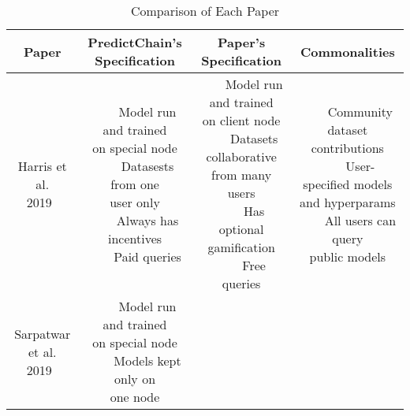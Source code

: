 \documentclass{article}
\newcommand{\tabitem}{~~\llap{\textbullet}~~}
\begin{document}
    \begin{table}[H]
        \begin{center}
            \caption{Comparison of Each Paper}
            \label{tab:relatedSummary}
            \bgroup
            \def\arraystretch{3}
            \begin{tabular}{c|c|c|c}
                \textbf{Paper} & \makecell{\textbf{PredictChain's}\\\textbf{Specification}} & \textbf{Paper's Specification} & \textbf{Commonalities}\\
                \hline
                \makecell{Harris et al.\\2019~\cite{sharingModels}} &
                \makecell[l]{
                    \tabitem Model run and trained\\on special node\\
                    \tabitem Datasests from one\\user only\\
                    \tabitem Always has incentives\\
                    \tabitem Paid queries\\
                } & \makecell[l]{
                    \tabitem Model run and trained\\on client node\\
                    \tabitem Datasets collaborative\\from many users\\
                    \tabitem Has optional\\gamification\\
                    \tabitem Free queries\\
                } & \makecell[l]{
                    \tabitem Community dataset\\contributions\\
                    \tabitem User-specified models\\and hyperparams\\
                    \tabitem All users can query\\public models\\
                }\\\hline
                \makecell[l]{Sarpatwar et al.\\2019~\cite{priceOfTrust}} &
                \makecell[l]{
                    \tabitem Model run and trained\\on special node\\
                    \tabitem Models kept only on\\one node\\
}
\end{tabular}
\end{center}
\end{table}
\end{document}
